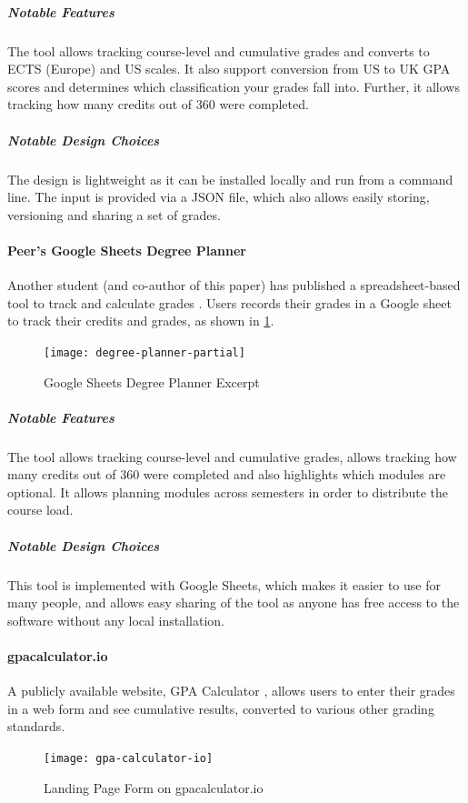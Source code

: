 \subparagraph{Notable Features}
The tool allows tracking course-level and cumulative grades and converts to ECTS (Europe) and US scales. It also support conversion from US to UK GPA scores and determines which classification your grades fall into. Further, it allows tracking how many credits out of 360 were completed.

\subparagraph{Notable Design Choices}
The design is lightweight as it can be installed locally and run from a command line. The input is provided via a JSON file, which also allows easily storing, versioning and sharing a set of grades.

\paragraph{Peer's Google Sheets Degree Planner}
Another student (and co-author of this paper) has published a spreadsheet-based tool to track and calculate grades \cite{muralidharan_2020}. Users records their grades in a Google sheet to track their credits and grades, as shown in \cref{fig:deg-planner}.
\begin{figure}[H]
\noindent \texttt{[image: degree-planner-partial]}
\centering
\caption{Google Sheets Degree Planner Excerpt}
\label{fig:deg-planner}
\end{figure}

\subparagraph{Notable Features}
The tool allows tracking course-level and cumulative grades, allows tracking how many credits out of 360 were completed and also highlights which modules are optional. It allows planning modules across semesters in order to distribute the course load.

\subparagraph{Notable Design Choices}
This tool is implemented with Google Sheets, which makes it easier to use for many people, and allows easy sharing of the tool as anyone has free access to the software without any local installation.

\paragraph{gpacalculator.io}

A publicly available website, GPA Calculator \cite{gpa_calculator}, allows users to enter their grades in a web form and see cumulative results, converted to various other grading standards.

\begin{figure}[H] 
\noindent \texttt{[image: gpa-calculator-io]}
\centering
\caption{Landing Page Form on gpacalculator.io}
\label{fig:gpa-calc}
\end{figure}
\medskip

